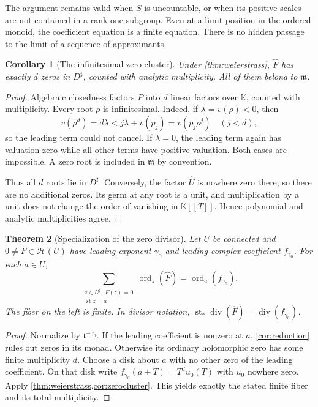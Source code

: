 \documentclass[11pt,a4paper]{article}
\numberwithin{equation}{section}
\newtheorem{theorem}{Theorem}[section]
\newtheorem{corollary}[theorem]{Corollary}
\theoremstyle{definition}
\newcommand{\K}{\mathbb K}
\newcommand{\tmon}{\mathfrak t}
\newcommand{\mm}{\mathfrak m}
\newcommand{\HH}{\mathscr H}
\newcommand{\st}{\operatorname{st}}
\newcommand{\ord}{\operatorname{ord}}
\newcommand{\hhat}[1]{\widehat{#1}}
\DeclareMathOperator{\divisor}{div}
\begin{document}
The argument remains valid when $S$ is uncountable, or when its positive
scales are not contained in a rank-one subgroup. Even at a limit position
in the ordered monoid, the coefficient equation is a finite equation.
There is no hidden passage to the limit of a sequence of approximants.

\begin{corollary}[The infinitesimal zero cluster]\label{cor:zerocluster}
Under \cref{thm:weierstrass}, $\hhat F$ has exactly $d$ zeros in $D^\sharp$,
counted with analytic multiplicity. All of them belong to $\mm$.
\end{corollary}
\begin{proof}
Algebraic closedness factors $P$ into $d$ linear factors over $\K$, counted
with multiplicity. Every root $\rho$ is infinitesimal. Indeed, if
$\lambda=v(\rho)<0$, then
\[
 v(\rho^d)=d\lambda<j\lambda+v(p_j)=v(p_j\rho^j)
 \quad(j<d),
\]
so the leading term could not cancel. If $\lambda=0$, the leading term again
has valuation zero while all other terms have positive valuation. Both cases
are impossible. A zero root is included in $\mm$ by convention.

Thus all $d$ roots lie in $D^\sharp$. Conversely, the factor $\hhat U$ is
nowhere zero there, so there are no additional zeros. Its germ at any root
is a unit, and multiplication by a unit does not change the order of
vanishing in $\K[[T]]$. Hence polynomial and analytic multiplicities agree.
\end{proof}

\begin{theorem}[Specialization of the zero divisor]\label{thm:divisor}
Let $U$ be connected and $0\neq F\in\HH(U)$ have leading exponent
$\gamma_0$ and leading complex coefficient $f_{\gamma_0}$. For each $a\in U$,
\begin{equation}\label{eq:divisor}
 \sum_{\substack{z\in U^\sharp,\ \hhat F(z)=0\\\st z=a}}
       \ord_z(\hhat F)
       =\ord_a(f_{\gamma_0}).
\end{equation}
The fiber on the left is finite. In divisor notation,
$\st_*\divisor(\hhat F)=\divisor(f_{\gamma_0})$.
\end{theorem}
\begin{proof}
Normalize by $\tmon^{-\gamma_0}$. If the leading coefficient is nonzero at
$a$, \cref{cor:reduction} rules out zeros in its monad. Otherwise its ordinary
holomorphic zero has some finite multiplicity $d$. Choose a disk about $a$
with no other zero of the leading coefficient. On that disk write
$f_{\gamma_0}(a+T)=T^du_0(T)$ with $u_0$ nowhere zero.
Apply \cref{thm:weierstrass,cor:zerocluster}. This yields exactly the stated
finite fiber and its total multiplicity.
\end{proof}
\end{document}
